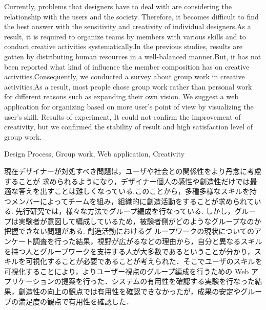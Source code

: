 \documentclass{funthesis}
\begin{document}
\maketitle       %

\begin{eabstract}
Currently, problems that designers have to deal with are considering the relationship with the users and the society. Therefore, it becomes difficult to find the best answer with the sensitivity and creativity of individual designers.As a result, it is required to organize teams by members with various skills and to conduct creative activities systematically.In the previous studies, results are gotten by distributing human resources in a well-balanced manner.But, it has not been reported what kind of influence the member composition has on creative activities.Consequently, we conducted a survey about group work in creative activities.As a result, most people chose group work rather than personal work for different reasons such as expanding their own vision.
We suggest a web application for organizing based on more user's point of view by visualizing the user's skill.
Results of experiment, It could not confirm the improvement of creativity, but we confirmed the stability of result and high satisfaction level of group work.
\end{eabstract}

\begin{ekeyword}
Design Process, Group work, Web application, Creativity
\end{ekeyword}

\begin{jabstract}
現在デザイナーが対処すべき問題は，ユーザや社会との関係性をより丹念に考慮することが 求められるようになり，デザイナー個人の感性や創造性だけでは最適な答えを出すことは難しくなっている.このことから，多種多様なスキルを持つメンバーによってチームを組み，組織的に創造活動をすることが求められている.  先行研究では，様々な方法でグループ編成を行なっている.  しかし，グループは実験者が意図して編成しているため，被験者側がどのようなグループなのか把握できない問題がある.  創造活動におけるグ ループワークの現状についてのアンケート調査を行った結果，視野が広がるなどの理由から，自分と異なるスキルを持つ人とグループワークを支持する人が大多数であるということが分かり，スキルを可視化することが必要であることが考えられた．そこでユーザのスキルを可視化することにより，よりユーザー視点のグループ編成を行うための Web アプリケーションの提案を行った．システムの有用性を確認する実験を行なった結果，創造性の向上の観点では有用性を確認できなかったが，成果の安定やグループの満足度の観点で有用性を確認した．
\end{jabstract}
\end{document}
